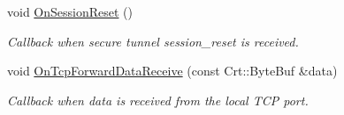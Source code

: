 \begin{DoxyCompactItemize}
\mbox{\label{class_aws_1_1_iot_1_1_device_client_1_1_secure_tunneling_1_1_secure_tunneling_context_a3863d150eee150129127e0639286907d}} 
void \hyperlink{class_aws_1_1_iot_1_1_device_client_1_1_secure_tunneling_1_1_secure_tunneling_context_a3863d150eee150129127e0639286907d}{On\+Session\+Reset} ()
\begin{DoxyCompactList}\small\item\em Callback when secure tunnel session\+\_\+reset is received. \end{DoxyCompactList}\item 
void \hyperlink{class_aws_1_1_iot_1_1_device_client_1_1_secure_tunneling_1_1_secure_tunneling_context_a72d579a67fd19f1462a15cee8033de73}{On\+Tcp\+Forward\+Data\+Receive} (const Crt\+::\+Byte\+Buf \&data)
\begin{DoxyCompactList}\small\item\em Callback when data is received from the local T\+CP port. \end{DoxyCompactList}\end{DoxyCompactItemize}

